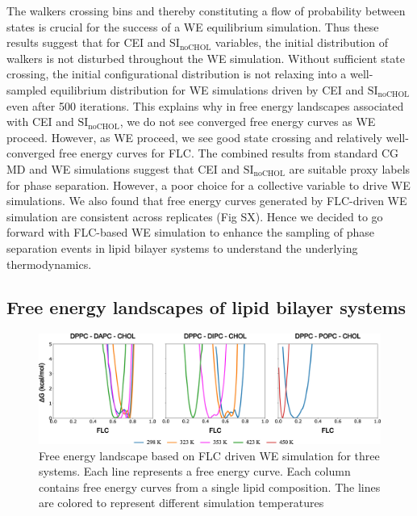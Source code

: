 \documentclass{biophys-new}
\begin{document}
The walkers crossing bins and thereby constituting a flow of probability between states is crucial for the success of a WE equilibrium simulation\cite{Zuckerman2017}.
Thus these results suggest that for CEI and $\text{SI}_{\text{noCHOL}}$ variables, the initial distribution of walkers is not disturbed throughout the WE simulation.
Without sufficient state crossing, the initial configurational distribution is not relaxing into a well-sampled equilibrium distribution for WE simulations driven by CEI and $\text{SI}_{\text{noCHOL}}$ even after 500 iterations. 
This explains why in free energy landscapes associated with CEI and $\text{SI}_{\text{noCHOL}}$, we do not see converged free energy curves as WE proceed.
However, as WE proceed, we see good state crossing and relatively well-converged free energy curves for FLC. 
The combined results from standard CG MD and WE simulations suggest that CEI and $\text{SI}_{\text{noCHOL}}$ are suitable proxy labels for phase separation. However, a poor choice for a collective variable to drive WE simulations.
We also found that free energy curves generated by FLC-driven WE simulation are consistent across replicates (Fig SX).
Hence we decided to go forward with FLC-based WE simulation to enhance the sampling of phase separation events in lipid bilayer systems to understand the underlying thermodynamics.
\\ 
\subsection*{Free energy landscapes of lipid bilayer systems}

\begin{figure}[hbt!]
\centering
\includegraphics[width=1\linewidth]{Figures/Main/5/placeholder.jpg}
\caption{Free energy landscape based on FLC driven WE simulation for three systems. Each line represents a free energy curve. Each column contains free energy curves from a single lipid composition. The lines are colored to represent different simulation temperatures}
\label{figs5:view}
\end{figure}
\end{document}
